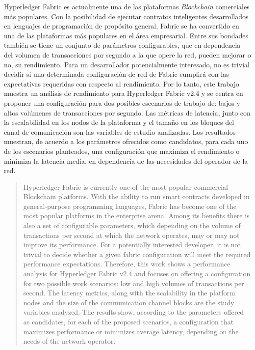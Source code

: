 \begin{resumen}
Hyperledger Fabric es actualmente una de las plataformas \emph{Blockchain} comerciales m\'as populares. Con la posibilidad de ejecutar contratos inteligentes desarrollados en lenguajes de programaci\'on de prop\'osito general, Fabric se ha convertido en una de las plataformas m\'as populares en el \'area empresarial. Entre sus bondades tambi\'en se tiene un conjunto de par\'ametros configurables, que en dependencia del volumen de transacciones por segundo a la que opere la red, pueden mejorar o no, su rendimiento. Para un desarrollador potencialmente interesado, no es trivial decidir si una determinada configuraci\'on de red de Fabric cumplir\'a con las expectativas requeridas con respecto al rendimiento. Por lo tanto, este trabajo muestra un an\'alisis de rendimiento para Hyperledger Fabric v2.4 y se centra en proponer una configuraci\'on para dos posibles escenarios de trabajo de: bajos y altos vol\'umenes de transacciones por segundo. Las m\'etricas de latencia, junto con la escalabilidad en los nodos de la plataforma y el tama\~no en los bloques del canal de comunicaci\'on son las variables de estudio analizadas. Los resultados muestran, de acuerdo a los par\'ametros ofrecidos como candidatos, para cada uno de los escenarios planteados, una configuraci\'on que maximiza el rendimiento o minimiza la latencia media, en dependencia de las necesidades del operador de la red.
\end{resumen}

\begin{abstract}
Hyperledger Fabric is currently one of the most popular commercial Blockchain platforms. With the ability to run smart contracts developed in general-purpose programming languages, Fabric has become one of the most popular platforms in the enterprise arena. Among its benefits there is also a set of configurable parameters, which depending on the volume of transactions per second at which the network operates, may or may not improve its performance. For a potentially interested developer, it is not trivial to decide whether a given fabric configuration will meet the required performance expectations. Therefore, this work shows a performance analysis for Hyperledger Fabric v2.4 and focuses on offering a configuration for two possible work scenarios: low and high volumes of transactions per second. The latency metrics, along with the scalability in the platform nodes and the size of the communication channel blocks are the study variables analyzed. The results show, according to the parameters offered as candidates, for each of the proposed scenarios, a configuration that maximizes performance or minimizes average latency, depending on the needs of the network operator.
\end{abstract}